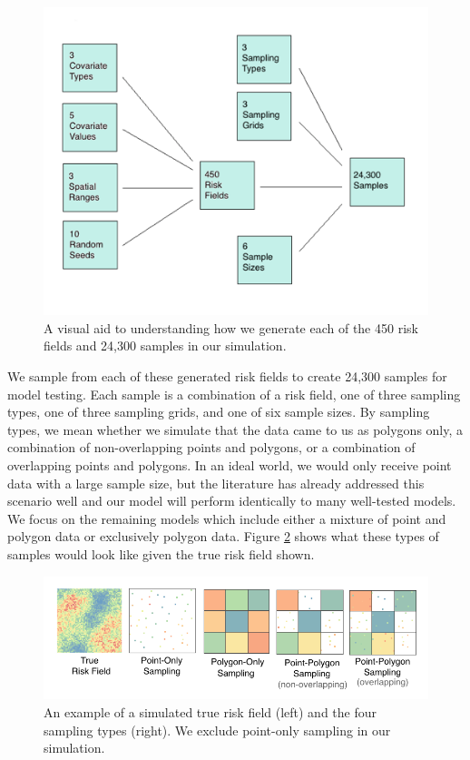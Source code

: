 \documentclass{article}
\begin{document}
 \begin{figure}[ht]
    \centering
    \includegraphics[width=.7\textwidth]{./figures/samplingexplained.png}
    \caption{A visual aid to understanding how we generate each of the 450 risk fields and 24,300 samples in our simulation.}
    \label{fig:parPlot}
\end{figure}

We sample from each of these generated risk fields to create 24,300 samples for model testing. Each sample is a combination of a risk field, one of three sampling types, one of three sampling grids, and one of six sample sizes. By sampling types, we mean whether we simulate that the data came to us as polygons only, a combination of non-overlapping points and polygons, or a combination of overlapping points and polygons. In an ideal world, we would only receive point data with a large sample size, but the literature has already addressed this scenario well and our model will perform identically to many well-tested models. We focus on the remaining models which include either a mixture of point and polygon data or exclusively polygon data. Figure \ref{fig:samplingPlot} shows what these types of samples would look like given the true risk field shown.

\begin{figure}[ht]
    \centering
    \includegraphics[width=.7\textwidth]{./figures/samplingtypes2.png}
    \caption{An example of a simulated true risk field (left) and the four sampling types (right). We exclude point-only sampling in our simulation.}
    \label{fig:samplingPlot}
\end{figure}
\end{document}
